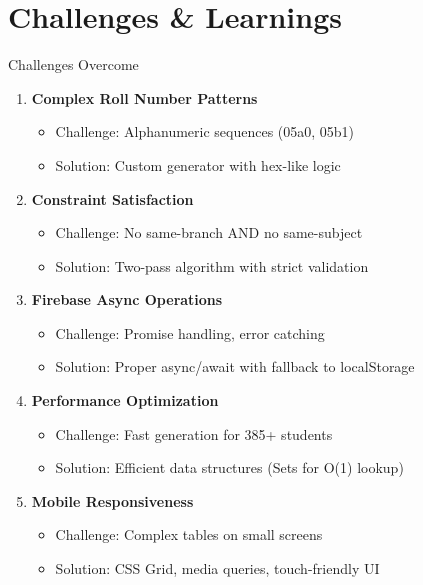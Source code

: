 \documentclass[aspectratio=169]{beamer}
\begin{document}
\section{Challenges \& Learnings}

\begin{frame}{Challenges Overcome}
\begin{enumerate}
    \item \textbf{Complex Roll Number Patterns}
    \begin{itemize}
        \item Challenge: Alphanumeric sequences (05a0, 05b1)
        \item Solution: Custom generator with hex-like logic
    \end{itemize}
    
    \item \textbf{Constraint Satisfaction}
    \begin{itemize}
        \item Challenge: No same-branch AND no same-subject
        \item Solution: Two-pass algorithm with strict validation
    \end{itemize}
    
    \item \textbf{Firebase Async Operations}
    \begin{itemize}
        \item Challenge: Promise handling, error catching
        \item Solution: Proper async/await with fallback to localStorage
    \end{itemize}
    
    \item \textbf{Performance Optimization}
    \begin{itemize}
        \item Challenge: Fast generation for 385+ students
        \item Solution: Efficient data structures (Sets for O(1) lookup)
    \end{itemize}
    
    \item \textbf{Mobile Responsiveness}
    \begin{itemize}
        \item Challenge: Complex tables on small screens
        \item Solution: CSS Grid, media queries, touch-friendly UI
    \end{itemize}
\end{enumerate}
\end{frame}
\end{document}
